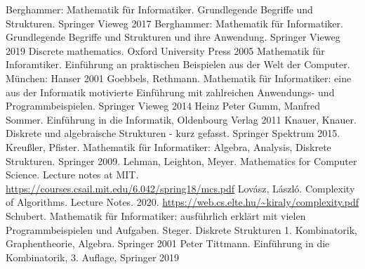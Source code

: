\begin{thebibliography}{AAAA}
		 Berghammer: Mathematik für Informatiker. Grundlegende Begriffe und Strukturen. Springer Vieweg 2017
		 Berghammer: Mathematik für Informatiker. Grundlegende Begriffe und Strukturen und ihre Anwendung. Springer Vieweg 2019
		 Discrete mathematics. Oxford University Press 2005
		 Mathematik für Inforamtiker. Einführung an praktischen Beispielen aus der Welt der Computer. München: Hanser 2001
		 Goebbels, Rethmann. Mathematik für Informatiker: eine aus der Informatik motivierte Einführung mit zahlreichen Anwendungs- und Programmbeispielen. Springer Vieweg 2014
		 Heinz Peter Gumm, Manfred Sommer. Einführung in die Informatik, Oldenbourg Verlag 2011
		 Knauer, Knauer. Diskrete und algebraische Strukturen - kurz gefasst. Springer Spektrum 2015. 
		 Kreußler, Pfister. Mathematik für Informatiker: Algebra, Analysis, Diskrete Strukturen. Springer 2009. 
		 Lehman, Leighton, Meyer. Mathematics for Computer Science. Lecture notes at MIT. \url{https://courses.csail.mit.edu/6.042/spring18/mcs.pdf} 
		 Lov\'asz, L\'aszl\'o. Complexity of Algorithms. Lecture Notes. 2020. \url{https://web.cs.elte.hu/~kiraly/complexity.pdf} 
		 Schubert. Mathematik für Informatiker: ausführlich erklärt mit vielen Programmbeispielen und Aufgaben.  
		 Steger. Diskrete Strukturen 1. Kombinatorik, Graphentheorie, Algebra. Springer 2001
		 Peter Tittmann. Einführung in die Kombinatorik, 3. Auflage, Springer 2019
\end{thebibliography} 





%
%

